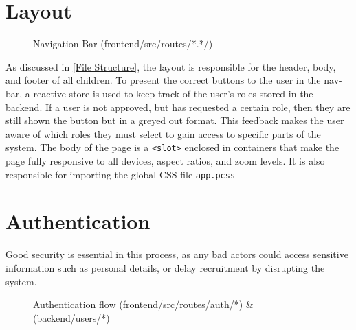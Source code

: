 \section{Layout}
\begin{figure}[h]
\centering
\caption{Navigation Bar (frontend/src/routes/*.*/)}
\vspace{-5pt}
\label{fig:nav}
\vspace{-20pt}
\end{figure}
As discussed in \ref{File Structure}, the layout is responsible for the header, body, and footer of all children. To present the correct buttons to the user in the nav-bar, a reactive store is used to keep track of the user's roles stored in the backend. If a user is not approved, but has requested a certain role, then they are still shown the button but in a greyed out format. This feedback makes the user aware of which roles they must select to gain access to specific parts of the system. The body of the page is a \texttt{<slot>} enclosed in containers that make the page fully responsive to all devices, aspect ratios, and zoom levels. It is also responsible for importing the global CSS file \texttt{app.pcss}

\section{Authentication}
Good security is essential in this process, as any bad actors could access sensitive information such as personal details, or delay recruitment by disrupting the system.

\begin{figure}[h]
\centering
{}
\vspace{-20pt}
\caption{Authentication flow (frontend/src/routes/auth/*) \& (backend/users/*)}
\label{fig:auth}
\vspace{-5pt}
\end{figure}

